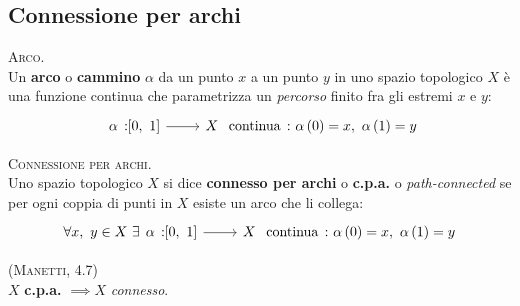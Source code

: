 \subsection{Connessione per archi}
\begin{define}\textsc{Arco.}\\
Un \textbf{arco} o \textbf{cammino} $\alpha$ da un punto $x$ a un punto $y$ in uno spazio topologico $X$ è una funzione continua che parametrizza un \textit{percorso} finito fra gli estremi $x$ e $y$:
\begin{equation}
\funz{\alpha}{\left[0,\ 1\right]}{X} \text{ continua}\ \colon \alpha\left(0\right)=x,\ \alpha\left(1\right)=y
\end{equation}
\vspace{-6mm}
\end{define}
\begin{define}\textsc{Connessione per archi.}\\
Uno spazio topologico $X$ si dice \textbf{connesso per archi} o \textbf{c.p.a.} o \textit{path-connected} se per ogni coppia di punti in $X$ esiste un arco che li collega:
\begin{equation}
\forall x,\ y\in X\ \exists \funz{\alpha}{\left[0,\ 1\right]}{X} \text{ continua}\ \colon \alpha\left(0\right)=x,\ \alpha\left(1\right)=y
\end{equation}
\vspace{-6mm}
\end{define}
\begin{theorema}\textsc{(Manetti, 4.7)}\\
$X$ \textbf{c.p.a.} $\implies X$ \textit{connesso}.
\end{theorema}
